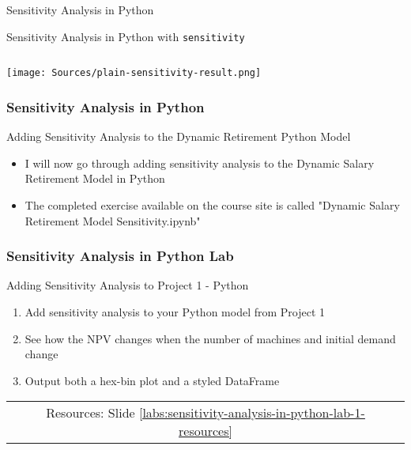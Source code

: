 \documentclass[handout, 11pt]{beamer}
\begin{document}
\begin{section}[SA Python]{Sensitivity Analysis in Python}
\begin{frame}[fragile]
\begin{block}{Sensitivity Analysis in Python with \texttt{sensitivity}}
\begin{verbatim}
\end{verbatim}
\texttt{[image: Sources/plain-sensitivity-result.png]}
\end{block}
\end{frame}
\begin{frame}
\frametitle{Sensitivity Analysis in Python}
{
\begin{block}{Adding Sensitivity Analysis to the Dynamic Retirement Python Model}
\begin{itemize}
\item I will now go through adding sensitivity analysis to the Dynamic Salary Retirement Model in Python
\item The completed exercise available on the course site is called "Dynamic Salary Retirement Model Sensitivity.ipynb"
\end{itemize}
\end{block}
}
\end{frame}
\begin{frame}
\frametitle{Sensitivity Analysis in Python Lab}
{
\begin{block}{Adding Sensitivity Analysis to Project 1 - Python}
\begin{enumerate}
\item Add sensitivity analysis to your Python model from Project 1
\item See how the NPV changes when the number of machines and initial demand change
\item Output both a hex-bin plot and a styled DataFrame
\end{enumerate}
\vfill
\begin{tabular*}{\textwidth}{@{\extracolsep{\fill}}ccc}
\toprule
\hfill & Resources: Slide \textcolor{blue}{\underline{\ref{labs:sensitivity-analysis-in-python-lab-1-resources}}} & \hfill\\

\end{tabular*}
\end{block}
}
\label{labs:sensitivity-analysis-in-python-lab-1}
\end{frame}
\end{section}
\appendix
{}
\setcounter{finalframe}{\value{framenumber}}
\end{document}
